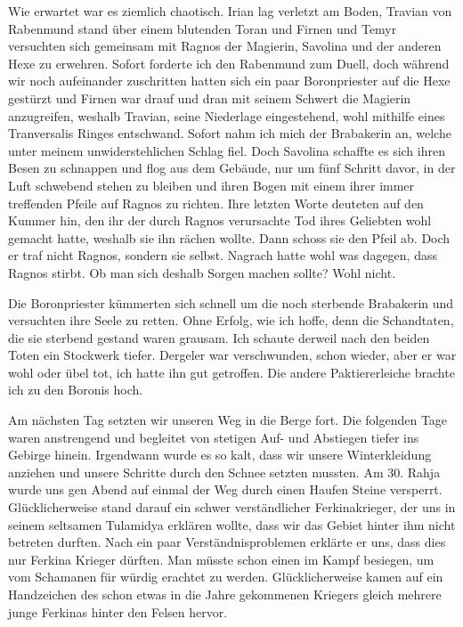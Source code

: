 Wie erwartet war es ziemlich chaotisch. Irian lag verletzt am Boden, Travian von Rabenmund stand über einem blutenden Toran und Firnen und Temyr versuchten sich gemeinsam mit Ragnos der Magierin, Savolina und der anderen Hexe zu erwehren. Sofort forderte ich den Rabenmund zum Duell, doch während wir noch aufeinander zuschritten hatten sich ein paar Boronpriester auf die Hexe gestürzt und Firnen war drauf und dran mit seinem Schwert die Magierin anzugreifen, weshalb Travian, seine Niederlage eingestehend, wohl mithilfe eines Tranversalis Ringes entschwand. Sofort nahm ich mich der Brabakerin an, welche unter meinem unwiderstehlichen Schlag fiel. Doch Savolina schaffte es sich ihren Besen zu schnappen und flog aus dem Gebäude, nur um fünf Schritt davor, in der Luft schwebend stehen zu bleiben und ihren Bogen mit einem ihrer immer treffenden Pfeile auf Ragnos zu richten. Ihre letzten Worte deuteten auf den Kummer hin, den ihr der durch Ragnos verursachte Tod ihres Geliebten wohl gemacht hatte, weshalb sie ihn rächen wollte. Dann schoss sie den Pfeil ab. Doch er traf nicht Ragnos, sondern sie selbst. Nagrach hatte wohl was dagegen, dass Ragnos stirbt. Ob man sich deshalb Sorgen machen sollte? Wohl nicht.

Die Boronpriester kümmerten sich schnell um die noch sterbende Brabakerin und versuchten ihre Seele zu retten. Ohne Erfolg, wie ich hoffe, denn die Schandtaten, die sie sterbend gestand waren grausam. Ich schaute derweil nach den beiden Toten ein Stockwerk tiefer. Dergeler war verschwunden, schon wieder, aber er war wohl oder übel tot, ich hatte ihn gut getroffen. Die andere Paktiererleiche brachte ich zu den Boronis hoch.

Am nächsten Tag setzten wir unseren Weg in die Berge fort. Die folgenden Tage waren anstrengend und begleitet von stetigen Auf- und Abstiegen tiefer ins Gebirge hinein. Irgendwann wurde es so kalt, dass wir unsere Winterkleidung anziehen und unsere Schritte durch den Schnee setzten mussten. Am 30. Rahja wurde uns gen Abend auf einmal der Weg durch einen Haufen Steine versperrt. Glücklicherweise stand darauf ein schwer verständlicher Ferkinakrieger, der uns in seinem seltsamen Tulamidya erklären wollte, dass wir das Gebiet hinter ihm nicht betreten durften. Nach ein paar Verständnisproblemen erklärte er uns, dass dies nur Ferkina Krieger dürften. Man müsste schon einen im Kampf besiegen, um vom Schamanen für würdig erachtet zu werden. Glücklicherweise kamen auf ein Handzeichen des schon etwas in die Jahre gekommenen Kriegers gleich mehrere junge Ferkinas hinter den Felsen hervor. 


